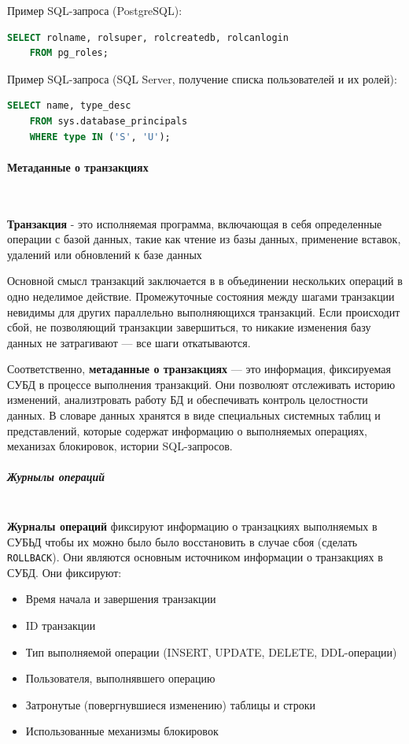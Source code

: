 \begin{enumerate}
    Пример SQL-запроса (PostgreSQL):
    \begin{lstlisting}[language=SQL]
    SELECT rolname, rolsuper, rolcreatedb, rolcanlogin 
    FROM pg_roles;             
    \end{lstlisting}

    Пример SQL-запроса (SQL Server, получение списка пользователей и их ролей):
    \begin{lstlisting}[language=SQL]
    SELECT name, type_desc 
    FROM sys.database_principals 
    WHERE type IN ('S', 'U');              
    \end{lstlisting}

\end{enumerate}

\paragraph{Метаданные о транзакциях} ~\\

\begin{grayquote}
    \textbf{Транзакция} - это исполняемая программа, включающая в себя определенные операции с базой данных, такие как чтение из базы данных, применение вставок, удалений или обновлений к базе данных \autocite{ElmasriNavathe}
\end{grayquote}

Основной смысл транзакций заключается в в объединении нескольких операций в одно неделимое действие. Промежуточные состояния между шагами транзакции невидимы для других параллельно выполняющихся транзакций. Если происходит сбой, не позволяющий транзакции завершиться, то никакие изменения базу данных не затрагивают — все шаги откатываются. \autocite{PostgreSQLdocc3p4}

Соответственно, \textbf{метаданные о транзакциях} — это информация, фиксируемая СУБД в процессе выполнения транзакций. Они позволюят отслеживать историю изменений, анализтровать работу БД и обеспечивать контроль целостности данных. В словаре данных хранятся в виде специальных системных таблиц и представлений, которые содержат информацию о выполняемых операциях, механизах блокировок, истории SQL-запросов.

\subparagraph{Журнылы операций} ~\\

\textbf{Журналы операций} фиксируют информацию о транзацкиях выполняемых в СУБЬД чтобы их можно было было восстановить в случае сбоя (сделать \texttt{ROLLBACK}). Они являются основным источником информации о транзакциях в СУБД. Они фиксируют:
\begin{itemize}
    \item Время начала и завершения транзакции
    \item ID транзакции
    \item Тип выполняемой операции (INSERT, UPDATE, DELETE, DDL-операции)
    \item Пользователя, выполнявшего операцию
    \item Затронутые (повергнувшиеся изменению) таблицы и строки
    \item Использованные механизмы блокировок
\end{itemize}

